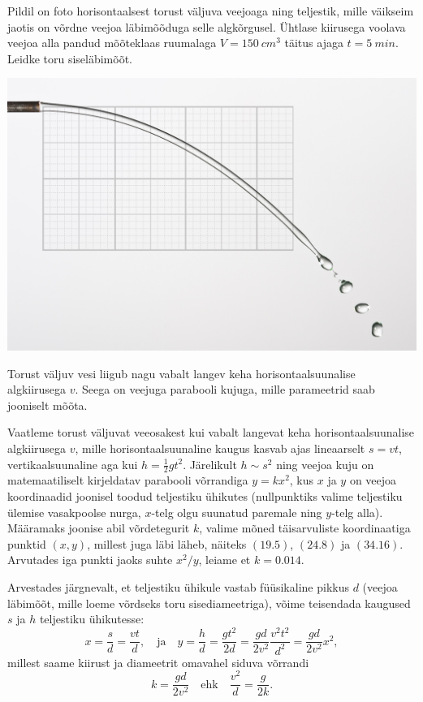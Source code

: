 
Pildil on foto horisontaalsest torust väljuva veejoaga ning teljestik, mille
väikseim jaotis on võrdne veejoa läbimõõduga selle algkõrgusel. Ühtlase
kiirusega voolava veejoa alla pandud mõõteklaas ruumalaga
$V=\SI{150}{cm^3}$ täitus ajaga $t=\SI{5}{min}$. Leidke
toru siseläbimõõt.
\begin{center}
\includegraphics[width=0.7\linewidth]{2012-v3g-02-jet}%
\end{center}

\hint
Torust väljuv vesi liigub nagu vabalt langev keha horisontaalsuunalise algkiirusega $v$. Seega on veejuga parabooli kujuga, mille parameetrid saab jooniselt mõõta.

\solu
Vaatleme torust väljuvat veeosakest kui vabalt langevat keha horisontaalsuunalise algkiirusega $v$, mille horisontaalsuunaline kaugus kasvab ajas lineaarselt $s=vt$, vertikaalsuunaline aga kui $h=\frac{1}{2}gt^2$. Järelikult $h\sim s^2$ ning veejoa kuju on matemaatiliselt kirjeldatav parabooli võrrandiga $y=kx^2$, kus $x$ ja $y$ on veejoa koordinaadid joonisel toodud teljestiku ühikutes (nullpunktiks valime teljestiku ülemise vasakpoolse nurga, $x$-telg olgu suunatud paremale ning $y$-telg alla). Määramaks joonise abil võrdetegurit $k$, valime mõned täisarvuliste koordinaatiga punktid $(x,y)$, millest juga läbi läheb, näiteks $(\num{19,5})$, $(\num{24,8})$ ja $(\num{34,16})$. Arvutades iga punkti jaoks suhte $x^2/y$, leiame et $k=\num{0.014}$. 
	
Arvestades järgnevalt, et teljestiku ühikule vastab füüsikaline pikkus $d$ (veejoa läbimõõt, mille loeme võrdseks toru sisediameetriga), võime teisendada kaugused $s$ ja $h$ teljestiku ühikutesse:
\[x=\frac{s}{d}=\frac{vt}{d},\quad \mathrm{ja} \quad y=\frac{h}{d}=\frac{gt^2}{2d}=\frac{gd}{2v^2}\frac{v^2t^2}{d^2}=\frac{gd}{2v^2}x^2,\]
millest saame kiirust ja diameetrit omavahel siduva võrrandi
\begin{equation}\label{eq:2012-v3g-02-vd1}
k=\frac{gd}{2v^2}\quad \mathrm{ehk} \quad \frac{v^2}{d}=\frac{g}{2k}.
\end{equation}
	
